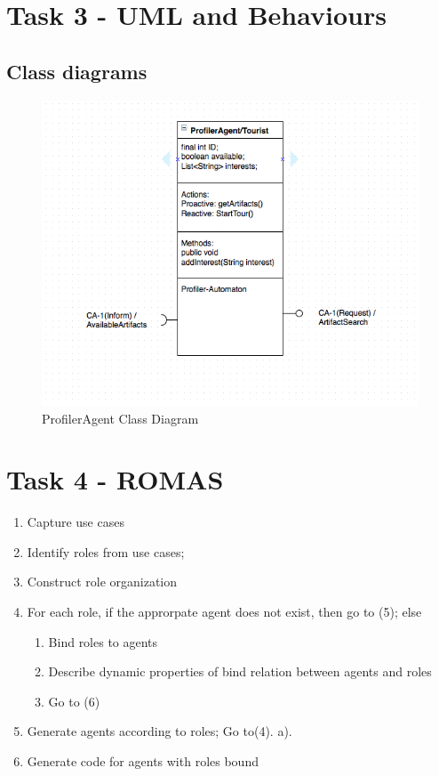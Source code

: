 \documentclass[a4paper, 11pt]{article}
\begin{document}
\section{Task 3 - UML and Behaviours}
\subsection{Class diagrams}

\begin{figure}[H]
	\caption{ProfilerAgent Class Diagram}
	\centering
	\includegraphics[width=\textwidth]{./images/profiler.png}
\end{figure}

\section{Task 4 - ROMAS}
\begin{enumerate}
\item Capture use cases
\item Identify roles from use cases;
\item Construct role organization
\item For each role, if the approrpate agent does not exist, then go to (5); else
\begin{enumerate}
\item Bind roles to agents
\item Describe dynamic properties of bind relation between agents and roles
\item Go to (6)
\end{enumerate}
\item Generate agents according to roles; Go to(4). a).
\item Generate code for agents with roles bound
\end{enumerate}
\end{document}
